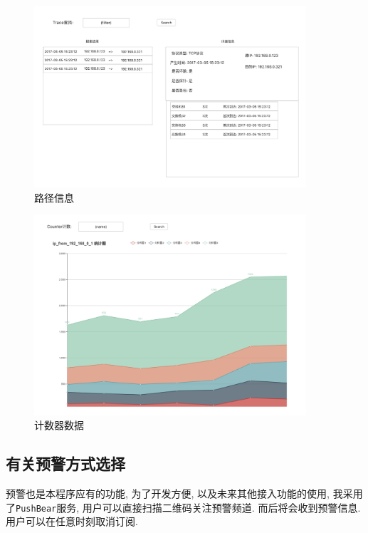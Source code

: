 \begin{figure}[htbp!]
  \centering
  \includegraphics[width=0.9\textwidth]{../img/traffic_data_show.png}
  \caption{路径信息}
  \label{fig:traffic_data_show}
\end{figure}

\begin{figure}[htbp!]
  \centering
  \includegraphics[width=0.9\textwidth]{../img/counter_data_show.png}
  \caption{计数器数据}
  \label{fig:counter_data_show}
\end{figure}

\subsection{有关预警方式选择}

  预警也是本程序应有的功能, 为了开发方便, 以及未来其他接入功能的使用,
我采用了\texttt{PushBear}服务, 用户可以直接扫描二维码关注预警频道.
而后将会收到预警信息. 用户可以在任意时刻取消订阅.

